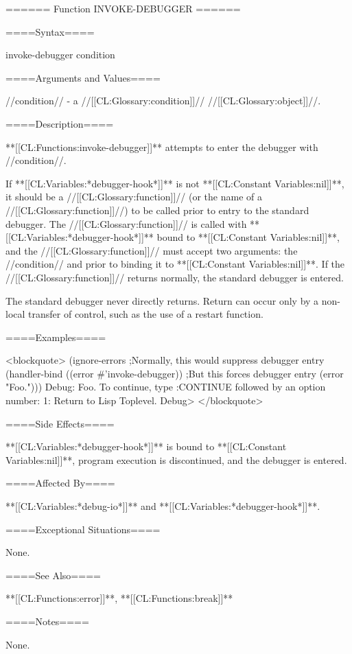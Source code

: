 ====== Function INVOKE-DEBUGGER ======

====Syntax====

\DefunNoReturn invoke-debugger {condition}

====Arguments and Values====

//condition// - a //[[CL:Glossary:condition]]// //[[CL:Glossary:object]]//.

====Description====

**[[CL:Functions:invoke-debugger]]** attempts to enter the debugger with //condition//.

If **[[CL:Variables:*debugger-hook*]]** is not **[[CL:Constant Variables:nil]]**, it should be a //[[CL:Glossary:function]]// (or the name of a //[[CL:Glossary:function]]//) to be called prior to entry to the standard debugger. The //[[CL:Glossary:function]]// is called with **[[CL:Variables:*debugger-hook*]]** bound to **[[CL:Constant Variables:nil]]**, and the //[[CL:Glossary:function]]// must accept two arguments: the //condition// and  prior to binding it to **[[CL:Constant Variables:nil]]**. If the //[[CL:Glossary:function]]// returns normally, the standard debugger is entered.


The standard debugger never directly returns. Return can occur only by a non-local transfer of control, such as the use of a restart function.

====Examples====

<blockquote> (ignore-errors ;Normally, this would suppress debugger entry (handler-bind ((error #'invoke-debugger)) ;But this forces debugger entry (error "Foo."))) Debug: Foo. To continue, type :CONTINUE followed by an option number: 1: Return to Lisp Toplevel. Debug> </blockquote>


====Side Effects====

**[[CL:Variables:*debugger-hook*]]** is bound to **[[CL:Constant Variables:nil]]**, program execution is discontinued, and the debugger is entered.

====Affected By====

**[[CL:Variables:*debug-io*]]** and **[[CL:Variables:*debugger-hook*]]**.

====Exceptional Situations====

None.

====See Also====

**[[CL:Functions:error]]**, **[[CL:Functions:break]]**

====Notes====

None.

